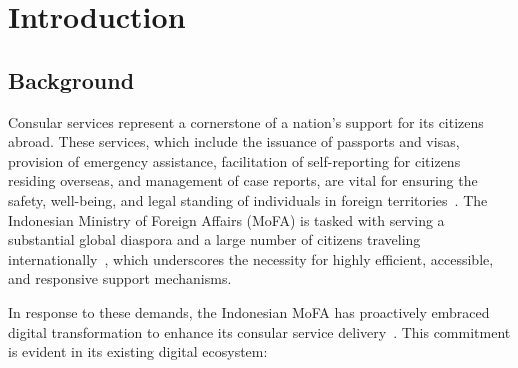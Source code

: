 \documentclass[12pt]{report}
\begin{document}
\newpage

\tableofcontents
\newpage

\listoffigures
\newpage

\listoftables
\newpage

\chapter{Introduction}
\section{Background}

Consular services represent a cornerstone of a nation's support for its citizens abroad. These services, which include the issuance of passports and visas, provision of emergency assistance, facilitation of self-reporting for citizens residing overseas, and management of case reports, are vital for ensuring the safety, well-being, and legal standing of individuals in foreign territories~\cite{UU37_1999,Keppres108_2003}. The Indonesian Ministry of Foreign Affairs (MoFA) is tasked with serving a substantial global diaspora and a large number of citizens traveling internationally~\cite{KPU301_2024}, which underscores the necessity for highly
efficient, accessible, and responsive support mechanisms.

In response to these demands, the Indonesian MoFA has proactively embraced digital transformation to enhance its consular service delivery~\cite{Tempo_AI_Kemlu}. This commitment is evident in its existing digital ecosystem:
\begin{table}[htbp]
    \centering
    \caption{Overview of Consular Service Platforms}
\end{table}
\end{document}
